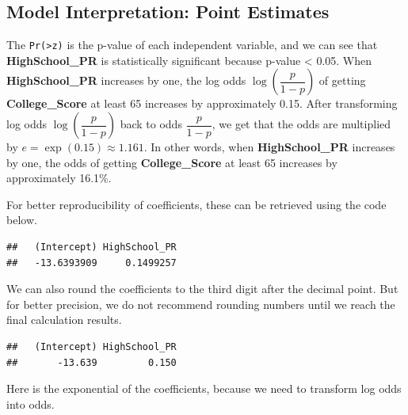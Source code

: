 \documentclass[
]{article}
\newenvironment{Shaded}{\begin{snugshade}}{\end{snugshade}}
\newcommand{\AttributeTok}[1]{\textcolor[rgb]{0.77,0.63,0.00}{#1}}
\newcommand{\DecValTok}[1]{\textcolor[rgb]{0.00,0.00,0.81}{#1}}
\newcommand{\FunctionTok}[1]{\textcolor[rgb]{0.00,0.00,0.00}{#1}}
\newcommand{\NormalTok}[1]{#1}
\newcommand{\SpecialCharTok}[1]{\textcolor[rgb]{0.00,0.00,0.00}{#1}}
\begin{document}
\hypertarget{logit-point-est}{%
\subsection{Model Interpretation: Point
Estimates}\label{logit-point-est}}

The \texttt{Pr(\textgreater{}\textbar{}z\textbar{})} is the p-value of
each independent variable, and we can see that \textbf{HighSchool\_PR}
is statistically significant because p-value \textless{} 0.05. When
\textbf{HighSchool\_PR} increases by one, the log odds
\(\log (\dfrac{p}{1-p})\) of getting \textbf{College\_Score} at least 65
increases by approximately 0.15. After transforming log odds
\(\log (\dfrac{p}{1-p})\) back to odds \(\dfrac{p}{1-p}\), we get that
the odds are multiplied by \(e = \exp(0.15) \approx 1.161\). In other
words, when \textbf{HighSchool\_PR} increases by one, the odds of
getting \textbf{College\_Score} at least 65 increases by approximately
16.1\%.

For better reproducibility of coefficients, these can be retrieved using
the code below.

\begin{Shaded}
\end{Shaded}

\begin{verbatim}
##   (Intercept) HighSchool_PR 
##   -13.6393909     0.1499257
\end{verbatim}

We can also round the coefficients to the third digit after the decimal
point. But for better precision, we do not recommend rounding numbers
until we reach the final calculation results.

\begin{Shaded}
\end{Shaded}

\begin{verbatim}
##   (Intercept) HighSchool_PR 
##       -13.639         0.150
\end{verbatim}

Here is the exponential of the coefficients, because we need to
transform log odds into odds.
\end{document}
